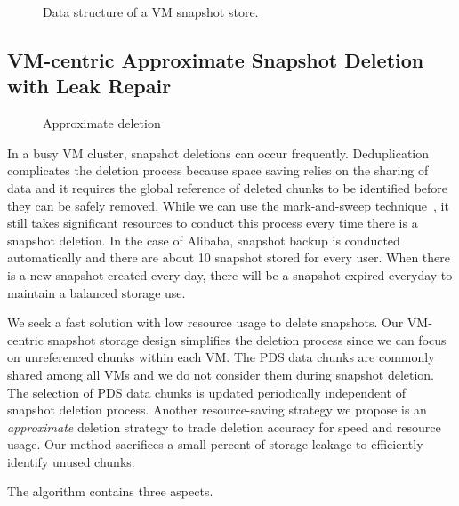 \begin{figure}[htbp]
  \centering
  \caption{Data structure of a VM snapshot store.}
  \label{fig:as_arch}
\end{figure}

\subsection{ VM-centric Approximate Snapshot Deletion with Leak Repair}
\label{sect:delete}

\begin{figure}[htbp]
  \centering
  \caption{Approximate deletion}
  \label{fig:deletion_flow}
\end{figure}

In a busy VM cluster, snapshot deletions can occur frequently.
Deduplication complicates the deletion process because space saving relies on the sharing of data
and it requires the global reference of deleted chunks to be identified before  they can be safely removed.
While we can use the mark-and-sweep technique~\cite{Guo2011}, 
it still takes significant resources to conduct this process every time there is a snapshot deletion.
In the case of Alibaba, snapshot backup is conducted automatically and there are 
about 10 snapshot stored for every user. When there is
a new snapshot created every day,  there will be  a snapshot expired everyday to maintain
a balanced storage use. 

We seek a fast solution with low resource usage to delete snapshots.
Our VM-centric snapshot storage design simplifies the deletion process since 
we can focus on  unreferenced chunks within each VM.
The PDS data chunks are commonly shared among all VMs and we do not consider them
during snapshot deletion.  The selection of PDS data chunks is updated periodically independent of snapshot deletion process.
Another resource-saving strategy we propose is
an {\em approximate} deletion strategy to trade deletion accuracy for
speed and resource usage. Our method sacrifices a small percent of storage leakage
to efficiently identify unused chunks.

The algorithm contains three aspects.

